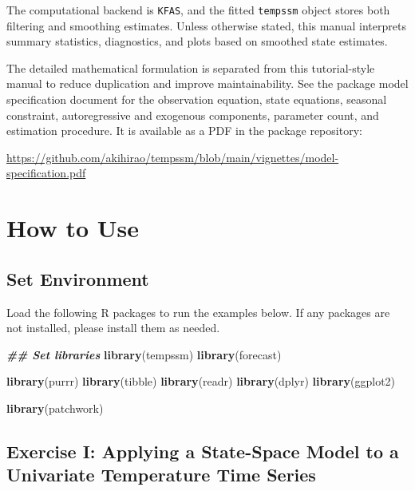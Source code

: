 \documentclass[
]{article}
\newenvironment{Shaded}{\begin{snugshade}}{\end{snugshade}}
\newcommand{\DocumentationTok}[1]{\textcolor[rgb]{0.56,0.35,0.01}{\textbf{\textit{#1}}}}
\newcommand{\FunctionTok}[1]{\textcolor[rgb]{0.13,0.29,0.53}{\textbf{#1}}}
\newcommand{\NormalTok}[1]{#1}
\begin{document}
The computational backend is \texttt{KFAS}, and the fitted
\texttt{tempssm} object stores both filtering and smoothing estimates.
Unless otherwise stated, this manual interprets summary statistics,
diagnostics, and plots based on smoothed state estimates.

The detailed mathematical formulation is separated from this
tutorial-style manual to reduce duplication and improve maintainability.
See the package model specification document for the observation
equation, state equations, seasonal constraint, autoregressive and
exogenous components, parameter count, and estimation procedure. It is
available as a PDF in the package repository:

\url{https://github.com/akihirao/tempssm/blob/main/vignettes/model-specification.pdf}

\section{How to Use}\label{how-to-use}

\subsection{Set Environment}\label{set-environment}

Load the following R packages to run the examples below. If any packages
are not installed, please install them as needed.

\begin{Shaded}
\begin{Highlighting}[]
\DocumentationTok{\#\# Set libraries}
\FunctionTok{library}\NormalTok{(tempssm)}
\FunctionTok{library}\NormalTok{(forecast)}

\FunctionTok{library}\NormalTok{(purrr) }
\FunctionTok{library}\NormalTok{(tibble)}
\FunctionTok{library}\NormalTok{(readr)}
\FunctionTok{library}\NormalTok{(dplyr)}
\FunctionTok{library}\NormalTok{(ggplot2)}

\FunctionTok{library}\NormalTok{(patchwork)}
\end{Highlighting}
\end{Shaded}

\subsection{Exercise I: Applying a State-Space Model to a Univariate
Temperature Time
Series}\label{exercise-i-applying-a-state-space-model-to-a-univariate-temperature-time-series}
\end{document}
